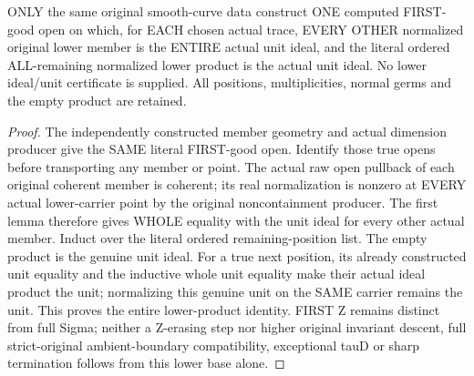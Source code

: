 \begin{theorem}
\label{hir:sharp-original-curve-first-good-whole-lower-product-unit}
\leanok
ONLY the same original smooth-curve data construct ONE computed FIRST-good
open on which, for EACH chosen actual trace, EVERY OTHER normalized
original lower member is the ENTIRE actual unit ideal, and the literal
ordered ALL-remaining normalized lower product is the actual unit ideal.
No lower ideal/unit certificate is supplied. All positions, multiplicities,
normal germs and the empty product are retained.
\end{theorem}
\begin{proof}
The independently constructed member geometry and actual dimension
producer give the SAME literal FIRST-good open. Identify those true opens
before transporting any member or point. The actual raw open pullback
of each original coherent member is coherent; its real normalization is
nonzero at EVERY actual lower-carrier point by the original noncontainment
producer. The first lemma therefore gives WHOLE equality with the unit
ideal for every other actual member. Induct over the literal ordered
remaining-position list. The empty product is the genuine unit ideal.
For a true next position, its already constructed unit equality and the
inductive whole unit equality make their actual ideal product the unit;
normalizing this genuine unit on the SAME carrier remains the unit.
This proves the entire lower-product identity. FIRST Z remains distinct
from full Sigma; neither a Z-erasing step nor higher original invariant
descent, full strict-original ambient-boundary compatibility, exceptional
tauD or sharp termination follows from this lower base alone.
\end{proof}
